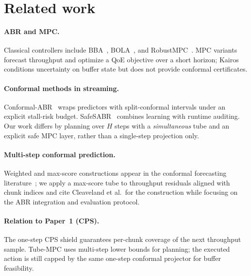 \section{Related work}
\label{sec:related}

\paragraph{ABR and MPC.}
Classical controllers include BBA~\cite{huang2014buffer}, BOLA~\cite{spiteri2018bola}, and RobustMPC~\cite{yin2015control}.
MPC variants forecast throughput and optimize a QoE objective over a short horizon; Kairos~\cite{zhong2025kairos} conditions uncertainty on buffer state but does not provide conformal certificates.

\paragraph{Conformal methods in streaming.}
Conformal-ABR~\cite{zhong2026conformalabr} wraps predictors with split-conformal intervals under an explicit stall-risk budget.
SafeSABR~\cite{liu2025safesabr} combines learning with runtime auditing.
Our work differs by planning over \(H\) steps with a \emph{simultaneous} tube and an explicit safe MPC layer, rather than a single-step projection only.

\paragraph{Multi-step conformal prediction.}
Weighted and max-score constructions appear in the conformal forecasting literature~\cite{cleaveland2024weighted}; we apply a max-score tube to throughput residuals aligned with chunk indices and cite Cleaveland et al.\ for the construction while focusing on the ABR integration and evaluation protocol.

\paragraph{Relation to Paper~1 (CPS).}
The one-step CPS shield guarantees per-chunk coverage of the next throughput sample.
Tube-MPC uses multi-step lower bounds for planning; the executed action is still capped by the same one-step conformal projector for buffer feasibility.
